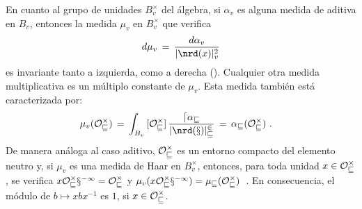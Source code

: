 En cuanto al grupo de unidades $B_{v}^{\times}$ del \'{a}lgebra, si
$\alpha_{v}$ es alguna medida de aditiva en $B_{v}$, entonces la medida
$\mu_{v}$ en $B_{v}^{\times}$ que verifica
\begin{equation}
	\label{eq:medidamultiplicativainducida}
	d\mu_{v} \,=\, \frac{d\alpha_{v}}{|\nrd(x)|_{v}^{2}}
\end{equation}
%
es invariante tanto a izquierda, como a derecha (\cite[Ch.~X \S~1]{WeilBasic}).
Cualquier otra medida multiplicativa es un m\'{u}ltiplo constante de $\mu_{v}$.
Esta medida tambi\'{e}n est\'{a} caracterizada por:
\begin{align*}
	\mu_{v}(\cal{O}_{v}^{\times}) & \,=\,\int_{B_{v}}\,
		[\cal{O}_{v}^{\times}]\,\frac{d\alpha_{v}}{|\nrd(x)|_{v}^{2}}
		\,=\,\alpha_{v}(\cal{O}_{v}^{\times})
	\text{ .}
\end{align*}
%
De manera an\'{a}loga al caso aditivo, $\cal{O}_{v}^{\times}$ es un entorno
compacto del elemento neutro y, si $\mu_{v}$ es una medida de Haar en
$B_{v}^{\times}$, entonces, para toda unidad $x\in\cal{O}_{v}^{\times}$, se
verifica $x\cal{O}_{v}^{\times}x^{-1}=\cal{O}_{v}^{\times}$ y
\begin{math}
	\mu_{v}(x\cal{O}_{v}^{\times}x^{-1}) =\mu_{v}(\cal{O}_{v}^{\times})
\end{math}~.
En consecuencia, el m\'{o}dulo de $b\mapsto xbx^{-1}$ es $1$, si
$x\in\cal{O}_{v}^{\times}$.

